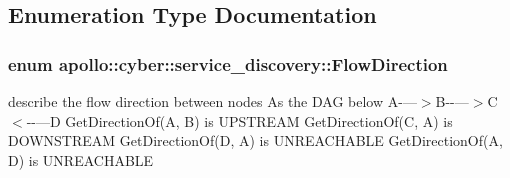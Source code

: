 \subsection{Enumeration Type Documentation}
\hypertarget{namespaceapollo_1_1cyber_1_1service__discovery_a463f9fa98e31287620adc568e1299c79}{
\subsubsection[{Flow\-Direction}]{\setlength{\rightskip}{0pt plus 5cm}enum {\bf apollo\-::cyber\-::service\-\_\-discovery\-::\-Flow\-Direction}}}\label{namespaceapollo_1_1cyber_1_1service__discovery_a463f9fa98e31287620adc568e1299c79}


describe the flow direction between nodes As the D\-A\-G below A-\/---$>$B-\/-\/---$>$C$<$-\/-\/---D Get\-Direction\-Of(\-A, B) is U\-P\-S\-T\-R\-E\-A\-M Get\-Direction\-Of(\-C, A) is D\-O\-W\-N\-S\-T\-R\-E\-A\-M Get\-Direction\-Of(\-D, A) is U\-N\-R\-E\-A\-C\-H\-A\-B\-L\-E Get\-Direction\-Of(\-A, D) is U\-N\-R\-E\-A\-C\-H\-A\-B\-L\-E 

